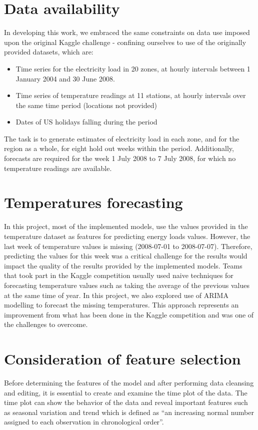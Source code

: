 \documentclass{article} %
\begin{document}
\section*{Data availability}
In developing this work, we embraced the same constraints on data use imposed upon the original Kaggle challenge - confining ourselves to use of the originally provided datasets, which are:
\begin{itemize}
\item Time series for the electricity load in 20 zones, at hourly intervals between 1 January 2004 and 30 June 2008.
\item Time series of temperature readings at 11 stations, at hourly intervals over the same time period (locations not provided)
\item Dates of US holidays falling during the period
\end{itemize}
The task is to generate estimates of electricity load in each zone, and for the region as a whole, for eight hold out weeks within the period.  Additionally, forecasts are required for the week 1 July 2008 to 7 July 2008, for which no temperature readings are available.

\section*{Temperatures forecasting}
In this project, most of the implemented models, use the values provided in the temperature dataset as features for predicting energy loads values. However, the last week of temperature values is missing (2008-07-01 to 2008-07-07). Therefore, predicting the values for this week was a critical challenge for the results would impact the quality of the results provided by the implemented models.
Teams that took part in the Kaggle competition usually used naive techniques for forecasting temperature values such as taking the average of the previous values at the same time of year. In this project, we also explored use of ARIMA modelling to forecast the missing temperatures. This approach represents an improvement from what has been done in the Kaggle competition and was one of the challenges to overcome.

\section*{Consideration of feature selection}
Before determining the features of the model and after performing data cleansing and editing, it is essential to create and examine the time plot of the data. The time plot can show the behavior of the data and reveal important features such as seasonal variation and trend which is defined as “an increasing normal number assigned to each observation in chronological order”.
\end{document}
